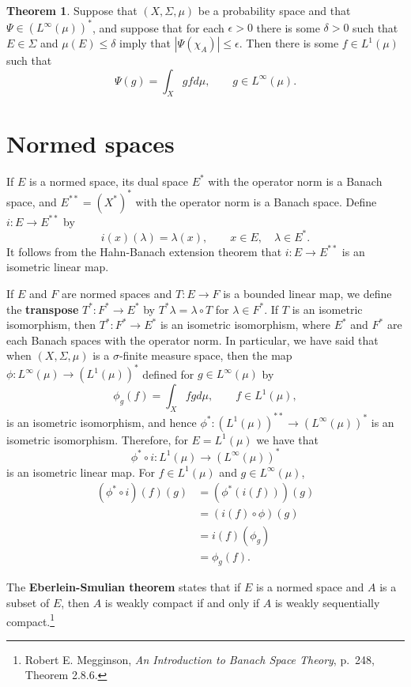 \documentclass{article}
\theoremstyle{definition}
\newtheorem{theorem}{Theorem}
\theoremstyle{definition}
\begin{document}
\begin{theorem}
Suppose that $(X,\Sigma,\mu)$ be a probability space and that $\Psi \in (L^\infty(\mu))^*$, and suppose that
 for each $\epsilon>0$ there
is some $\delta>0$ such that $E \in \Sigma$ and $\mu(E) \leq \delta$ imply that
$|\Psi(\chi_A)| \leq \epsilon$.
Then there is some $f \in L^1(\mu)$ such that
\[
\Psi(g) = \int_X gf d\mu, \qquad g \in L^\infty(\mu).
\]
\label{Linfinity}
\end{theorem}


\section{Normed spaces}
If $E$ is a normed space, its dual space $E^*$ with the operator norm is a Banach space, and  $E^{**}=(X^*)^*$ with the operator
norm is a Banach space. Define $i:E \to E^{**}$ by
\[
i(x)(\lambda)=\lambda(x), \qquad x \in E, \quad \lambda \in E^*.
\]
It follows from the Hahn-Banach extension theorem that $i:E \to E^{**}$ is an isometric linear map. 

If $E$ and $F$ are normed spaces and $T:E \to F$ is a bounded linear map, we define the \textbf{transpose} $T^*:F^* \to E^*$ by
$T^* \lambda = \lambda \circ T$ for $\lambda \in F^*$. If $T$ is an isometric isomorphism, then $T^*:F^* \to E^*$ is an isometric isomorphism, where
$E^*$ and $F^*$ are each Banach spaces with the operator norm. In particular, we have said that when $(X,\Sigma,\mu)$ is a 
$\sigma$-finite measure space, then the map $\phi:L^\infty(\mu) \to (L^1(\mu))^*$ defined for $g \in L^\infty(\mu)$ by
\[
\phi_g(f) = \int_X fg d\mu, \qquad f \in L^1(\mu),
\]
is an isometric isomorphism, and hence $\phi^*:(L^1(\mu))^{**} \to (L^\infty(\mu))^*$ is an isometric isomorphism.
Therefore, for $E=L^1(\mu)$ we have that
\begin{equation}
\phi^* \circ i:L^1(\mu) \to (L^\infty(\mu))^*
\label{isometric}
\end{equation}
is an isometric linear map. For $f \in L^1(\mu)$ and $g \in L^\infty(\mu)$,
\begin{align*}
(\phi^* \circ i)(f)(g)&=(\phi^*(i(f)))(g)\\
&=(i(f) \circ \phi)(g)\\
&=i(f)(\phi_g)\\
&=\phi_g(f).
\end{align*}

The \textbf{Eberlein-Smulian theorem} states that if $E$ is a normed space and $A$ is a subset of $E$, then $A$ is weakly
compact if and only if $A$ is weakly sequentially compact.\footnote{Robert E. Megginson, {\em An Introduction to Banach
Space Theory}, p.~248, Theorem 2.8.6.}
\end{document}
